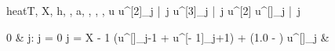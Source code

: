 \documentclass[12pt,a4paper]{book}
\begin{document}

\begin{eqcode}{heat}{T, X, h, \tau, a}{, , ,
, }{}
  \pi {} \lend
  u \in {} \lend
  u^{[2]}_j |\ \forall j  \lend
  u^{[3]}_j |\ \forall j \gets u^{[2]} \lend %
  u^{[\iter]}_j |\ \forall j \quad \; \; \gets 
  \begin{cases}
    0 & j: j = 0 \cup j = X - 1 \lend
   \cdot (u^{[]}_{j-1} +
    u^{[\iter - 1]}_{j+1}) + (1.0 - ) \cdot
    u^{[]}_j & \otherwise \lend
  \end{cases} \lend
   \lend
\end{eqcode}
\end{document}
